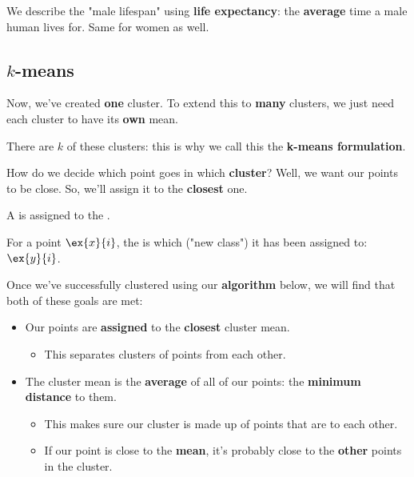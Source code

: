         \miniex We describe the "male lifespan" using \textbf{life expectancy}: the \textbf{average} time a male human lives for. Same for women as well.
         
    \subsection{$k$-means}
    
        Now, we've created \textbf{one} cluster. To extend this to \textbf{many} clusters, we just need each cluster to have its \textbf{own} mean.
        
        There are $k$ of these clusters: this is why we call this the \textbf{k-means formulation}.
        
        How do we decide which point goes in which \textbf{cluster}? Well, we want our points to be close. So, we'll assign it to the \textbf{closest} one.\\
        
        \begin{concept}
            A  is assigned to the  .
            
            For a point $\ex{x}{i}$, the  is which  ("new class") it has been assigned to: $\ex{y}{i}$.
        \end{concept}
        
        Once we've successfully clustered using our \textbf{algorithm} below, we will find that both of these goals are met:
        
        \begin{itemize}
            \item Our points are \textbf{assigned} to the \textbf{closest} cluster mean.
            
                \begin{itemize}
                    \item This separates  clusters of points from each other.
                \end{itemize}
            
            \item The cluster mean is the \textbf{average} of all of our points: the \textbf{minimum distance} to them.
            
                \begin{itemize}
                    \item This makes sure our cluster is made up of points that are  to each other.
                    
                    \item If our point is close to the \textbf{mean}, it's probably close to the \textbf{other} points in the cluster.
                \end{itemize}
        \end{itemize}
        
